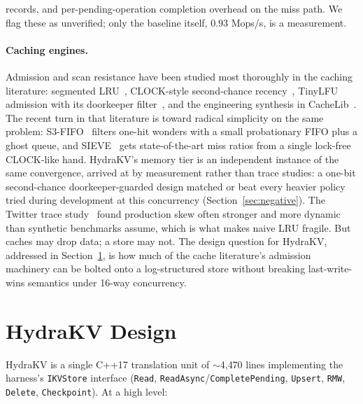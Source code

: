 \documentclass{article}
\newcommand{\FASTERBase}{0.93}          %
\newcommand{\EngineLocFinal}{$\sim$4{,}470}
\begin{document}
records, and per-pending-operation completion overhead on the miss path. We flag these as unverified; only the baseline itself, \FASTERBase{} Mops/s, is a measurement.

\paragraph{Caching engines.} Admission and scan resistance have been studied most thoroughly in the caching literature: segmented LRU~\cite{slru}, CLOCK-style second-chance recency~\cite{clock}, TinyLFU admission with its doorkeeper filter~\cite{tinylfu}, and the engineering synthesis in CacheLib~\cite{cachelib}. The recent turn in that literature is toward radical simplicity on the same problem: S3-FIFO~\cite{s3fifo} filters one-hit wonders with a small probationary FIFO plus a ghost queue, and SIEVE~\cite{sieve} gets state-of-the-art miss ratios from a single lock-free CLOCK-like hand. HydraKV's memory tier is an independent instance of the same convergence, arrived at by measurement rather than trace studies: a one-bit second-chance doorkeeper-guarded design matched or beat every heavier policy tried during development at this concurrency (Section~\ref{sec:negative}). The Twitter trace study~\cite{yang-osdi20} found production skew often stronger and more dynamic than synthetic benchmarks assume, which is what makes naive LRU fragile. But caches may drop data; a store may not. The design question for HydraKV, addressed in Section~\ref{sec:design}, is how much of the cache literature's admission machinery can be bolted onto a log-structured store without breaking last-write-wins semantics under 16-way concurrency.

\section{HydraKV Design}
\label{sec:design}

HydraKV is a single C++17 translation unit of \EngineLocFinal{} lines implementing the harness's \texttt{IKVStore} interface (\texttt{Read}, \texttt{ReadAsync}/\texttt{CompletePending}, \texttt{Upsert}, \texttt{RMW}, \texttt{Delete}, \texttt{Checkpoint}). At a high level:
\end{document}
